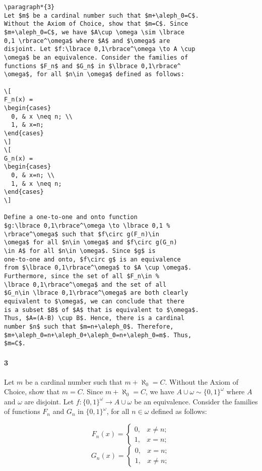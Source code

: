 \begin{verbatim}
\paragraph*{3}
Let $m$ be a cardinal number such that $m+\aleph_0=C$.
Without the Axiom of Choice, show that $m=C$. Since
$m+\aleph_0=C$, we have $A\cup \omega \sim \lbrace
0,1 \rbrace^\omega$ where $A$ and $\omega$ are
disjoint. Let $f:\lbrace 0,1\rbrace^\omega \to A \cup
\omega$ be an equivalence. Consider the families of
functions $F_n$ and $G_n$ in $\lbrace 0,1\rbrace^
\omega$, for all $n\in \omega$ defined as follows:

\[
F_n(x) =
\begin{cases}
  0, & x \neq n; \\
  1, & x=n;
\end{cases}
\]
\[
G_n(x) =
\begin{cases}
  0, & x=n; \\
  1, & x \neq n;
\end{cases}
\]

Define a one-to-one and onto function
$g:\lbrace 0,1\rbrace^\omega \to \lbrace 0,1 %
\rbrace^\omega$ such that $f\circ g(F_n)\in
\omega$ for all $n\in \omega$ and $f\circ g(G_n)
\in A$ for all $n\in \omega$. Since $g$ is
one-to-one and onto, $f\circ g$ is an equivalence
from $\lbrace 0,1\rbrace^\omega$ to $A \cup \omega$.
Furthermore, since the set of all $F_n\in %
\lbrace 0,1\rbrace^\omega$ and the set of all
$G_n\in \lbrace 0,1\rbrace^\omega$ are both clearly
equivalent to $\omega$, we can conclude that there
is a subset $B$ of $A$ that is equivalent to $\omega$.
Thus, $A=(A-B) \cup B$. Hence, there is a cardinal
number $n$ such that $m=n+\aleph_0$. Therefore,
$m+\aleph_0=n+\aleph_0+\aleph_0=n+\aleph_0=m$. Thus,
$m=C$.
\end{verbatim}

\paragraph*{3}
Let $m$ be a cardinal number such that $m+\aleph_0=C$.  Without the
Axiom of Choice, show that $m=C$. Since $m+\aleph_0=C$, we have $A\cup
\omega \sim \lbrace 0,1 \rbrace^\omega$ where $A$ and $\omega$ are
disjoint.  Let $f:\lbrace 0,1\rbrace^\omega \to A \cup \omega$ be an
equivalence. Consider the families of functions $F_n$ and $G_n$ in
$\lbrace 0,1\rbrace^\omega$, for all $n\in \omega$ defined as follows:

\[
F_n(x) =
\begin{cases}
  0, & x \neq n; \\
  1, & x=n;
\end{cases}
\]
\[
G_n(x) =
\begin{cases}
  0, & x=n; \\
  1, & x \neq n;
\end{cases}
\]

